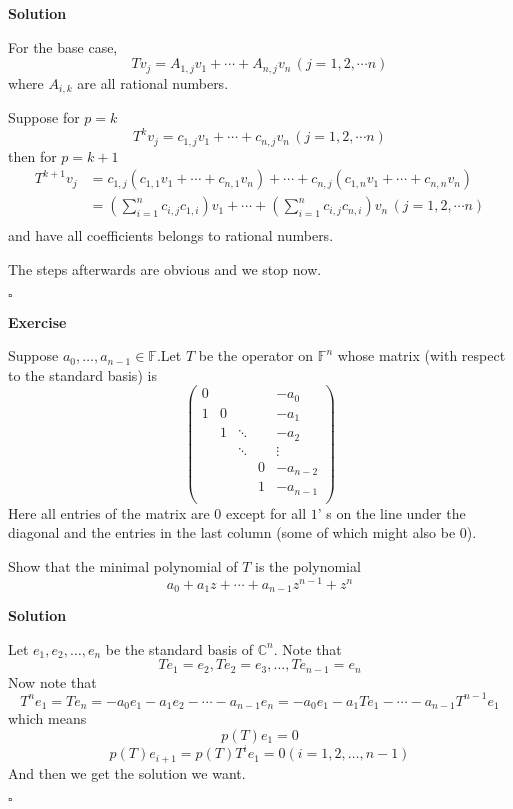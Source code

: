 \documentclass{article}
\newenvironment{exercise}{%
{\textbf{Exercise\\}
    }
}{
}
\newenvironment{solution}{%
{
    \textbf{Solution\\}
    }
}{
  \hfill $\square$ 
  \par\bigskip 
}
\newcommand{\CC}{\mathbb{C}}
\newcommand{\FF}{\mathbb{F}}
\begin{document}
\begin{CJK}{UTF8}{gkai}
\begin{solution}
    For the base case,
    \[Tv_j = A_{1,j} v_1 + \cdots + A_{n,j} v_n\, (j = 1, 2,\cdots n)\]
    where $A_{i,k}$ are all rational numbers.

    Suppose for $p = k$
    \[T^k v_j = c_{1,j} v_1 + \cdots + c_{n,j} v_n\, (j = 1, 2,\cdots n)\] 
    then for $p = k + 1$
    \[
    \begin{aligned} 
        T^{k + 1} v_j &= c_{1,j} (c_{1,1} v_1 + \cdots + c_{n,1} v_n) + \cdots + c_{n,j} (c_{1,n} v_1 + \cdots + c_{n,n} v_n) \\
        &=(\sum_{i = 1}^n c_{i,j}c_{1,i}) v_1 + \cdots + (\sum_{i = 1}^n c_{i,j}c_{n,i})v_n \, (j = 1, 2,\cdots n)\\
    \end{aligned}    
    \] 
    and have all coefficients belongs to rational numbers.

    The steps afterwards are obvious and we stop now.
\end{solution}

\begin{exercise}
    Suppose $a_0,\ldots,a_{n-1}\in\FF$.Let $T$ be the operator on $\FF^n$ whose matrix (with respect to the standard basis) is
    \[\begin{pmatrix}
        0&&&&-a_0\\
        1&0&&&-a_1\\
        &1&\ddots&&-a_2\\
        &&\ddots&&\vdots\\
        &&&0&-a_{n - 2}\\
        &&&1&-a_{n - 1}\\
    \end{pmatrix}\]
    Here all entries of the matrix are $0$ except for all $1$' s on the line under the diagonal and the entries in the last column (some of which might also be $0$).

    Show that the minimal polynomial of $T$ is the polynomial
    \[a_0+a_1z+\cdots+a_{n-1}z^{n-1}+z^n\]
\end{exercise}

\begin{solution}
    Let $e_1,e_2,\ldots,e_n$ be the standard basis of $\CC^n$. Note that 
    \[Te_1=e_2,Te_2=e_3,\ldots,Te_{n - 1}=e_n\]
    Now note that
    \[T^n e_1 = T e_n = -a_0 e_1 - a_1 e_2 - \cdots - a_{n-1}e_n = -a_0 e_1 - a_1 T e_1 - \cdots - a_{n-1} T^{n-1}e_1\]
    which means
    \[p(T)e_1 = 0\]
    \[p(T)e_{i + 1} = p(T)T^{i}e_1 = 0 (i = 1,2,\ldots, n - 1)\]
    And then we get the solution we want.
\end{solution}


\end{CJK}
\end{document}
